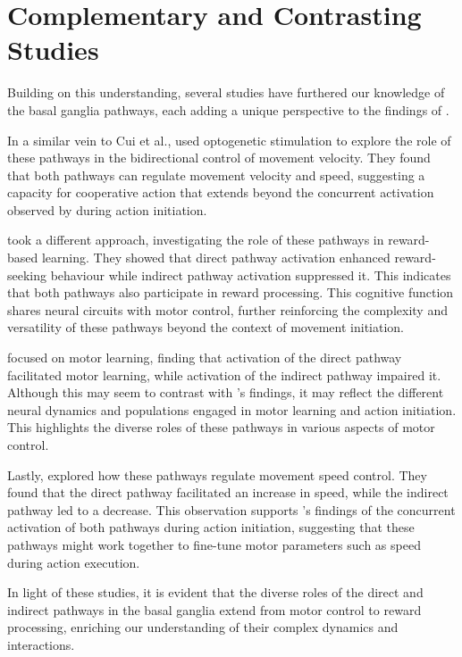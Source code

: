 \documentclass[10pt]{article}
\begin{document}
\begin{sloppypar}
  \section{Complementary and Contrasting Studies}
  \label{sec:complementary-and-contrasting-studies}

  Building on this understanding, several studies have furthered our knowledge of the basal ganglia pathways, each adding a unique perspective to the findings of \cite{cui_concurrent_2013}.

  In a similar vein to Cui et al., \cite{yttri_opponent_2016} used optogenetic stimulation to explore the role of these pathways in the bidirectional control of movement velocity. They found that both pathways can regulate movement velocity and speed, suggesting a capacity for cooperative action that extends beyond the concurrent activation observed by \cite{cui_concurrent_2013} during action initiation.

  \cite{guillaumin_experimental_2021} took a different approach, investigating the role of these pathways in reward-based learning. They showed that direct pathway activation enhanced reward-seeking behaviour while indirect pathway activation suppressed it. This indicates that both pathways also participate in reward processing. This cognitive function shares neural circuits with motor control, further reinforcing the complexity and versatility of these pathways beyond the context of movement initiation.

  \cite{hilt_evidence_2016} focused on motor learning, finding that activation of the direct pathway facilitated motor learning, while activation of the indirect pathway impaired it. Although this may seem to contrast with \cite{cui_concurrent_2013}’s findings, it may reflect the different neural dynamics and populations engaged in motor learning and action initiation. This highlights the diverse roles of these pathways in various aspects of motor control.

  Lastly, \cite{wang_direct_2015} explored how these pathways regulate movement speed control. They found that the direct pathway facilitated an increase in speed, while the indirect pathway led to a decrease. This observation supports \cite{cui_concurrent_2013}’s findings of the concurrent activation of both pathways during action initiation, suggesting that these pathways might work together to fine-tune motor parameters such as speed during action execution.

  In light of these studies, it is evident that the diverse roles of the direct and indirect pathways in the basal ganglia extend from motor control to reward processing, enriching our understanding of their complex dynamics and interactions.


\end{sloppypar}
\end{document}
